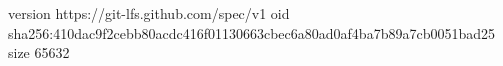 version https://git-lfs.github.com/spec/v1
oid sha256:410dac9f2cebb80acdc416f01130663cbec6a80ad0af4ba7b89a7cb0051bad25
size 65632
